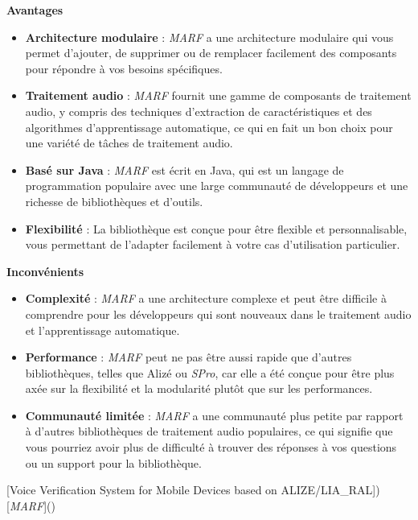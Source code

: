 \begin{itemize}
          \textbf{Avantages}
          \begin{itemize}
              \item \textbf{Architecture modulaire} : \textit{MARF} a une architecture modulaire qui vous permet d'ajouter, de supprimer ou de remplacer facilement des composants
                    pour répondre à vos besoins spécifiques.
              \item \textbf{Traitement audio} : \textit{MARF} fournit une gamme de composants de traitement audio, y compris des techniques d'extraction de caractéristiques et des
                    algorithmes d'apprentissage automatique, ce qui en fait un bon choix pour une variété de tâches de traitement audio.
              \item \textbf{Basé sur Java} : \textit{MARF} est écrit en Java, qui est un langage de programmation populaire avec une large communauté de développeurs et une richesse
                    de bibliothèques et d'outils.
              \item \textbf{Flexibilité} : La bibliothèque est conçue pour être flexible et personnalisable, vous permettant de l'adapter facilement à votre cas d'utilisation particulier.
          \end{itemize}


          \textbf{Inconvénients}
          \begin{itemize}
              \item \textbf{Complexité} : \textit{MARF} a une architecture complexe et peut être difficile à comprendre pour les développeurs qui sont nouveaux dans le traitement audio
                    et l'apprentissage automatique.
              \item \textbf{Performance} : \textit{MARF} peut ne pas être aussi rapide que d'autres bibliothèques, telles que Alizé ou \textit{SPro}, car elle a été conçue pour être
                    plus axée sur la flexibilité et la modularité plutôt que sur les performances.
              \item \textbf{Communauté limitée} : \textit{MARF} a une communauté plus petite par rapport à d'autres bibliothèques de traitement audio populaires, ce qui signifie que
                    vous pourriez avoir plus de difficulté à trouver des réponses à vos questions ou un support pour la bibliothèque.
          \end{itemize}




\end{itemize}
[Voice Verification System for Mobile Devices based on ALIZE/LIA_RAL])
[\textit{MARF}]()

